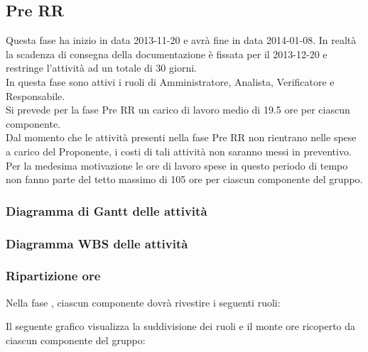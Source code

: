 \subsection{Pre RR}
Questa fase ha inizio in data 2013-11-20 e avrà fine in data 2014-01-08. In realtà la scadenza di consegna della documentazione è fissata per il 2013-12-20 e restringe l'attività ad un totale di 30 giorni.\\
In questa fase sono attivi i ruoli di Amministratore, Analista, Verificatore e Responsabile.\\
Si prevede per la fase Pre RR un carico di lavoro medio di 19.5 ore per ciascun componente.\\
Dal momento che le attività presenti nella fase Pre RR non rientrano nelle spese a carico del Proponente, i costi di tali attività non saranno messi in preventivo.\\
Per la medesima motivazione le ore di lavoro spese in questo periodo di tempo non fanno parte del tetto massimo di 105 ore per ciascun componente del gruppo.

\subsubsection{Diagramma di Gantt delle attività}

\newpage
\subsubsection{Diagramma WBS delle attività}

\newpage
\subsubsection{Ripartizione ore}

\newpage
Nella fase , ciascun componente dovrà rivestire i seguenti ruoli:

Il seguente grafico visualizza la suddivisione dei ruoli e il monte ore ricoperto da ciascun componente del gruppo:
